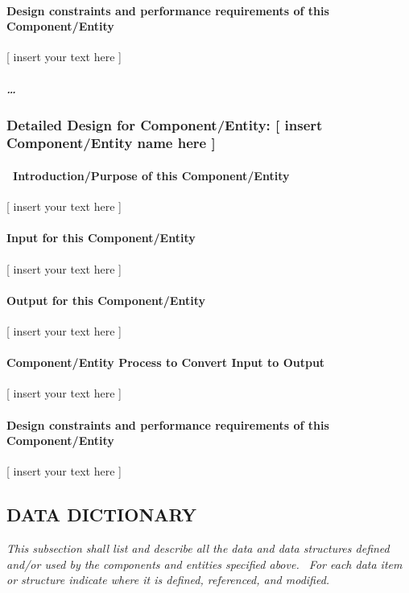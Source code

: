 \documentclass[twoside,letterpaper]{article}
\begin{document}
\paragraph{Design constraints and performance requirements of this
Component/Entity}
{\color{black}
[ insert your text here ]}

\subparagraph[{\dots}]{{\dots}}
\subsubsection{Detailed Design for Component/Entity: [ insert
Component/Entity name here ]}
\paragraph[\ Introduction/Purpose of this
Component/Entity]{\ Introduction/Purpose of this Component/Entity}
{\color{black}
[ insert your text here ]}

\paragraph{Input for this Component/Entity}
{\color{black}
[ insert your text here ]}

\paragraph{Output for this Component/Entity}
{\color{black}
[ insert your text here ]}

\paragraph{Component/Entity Process to Convert Input to Output}
{\color{black}
[ insert your text here ]}

\paragraph{Design constraints and performance requirements of this
Component/Entity}
{\color{black}
[ insert your text here ]}

\subsection{DATA DICTIONARY}
{\itshape\color{black}
This subsection shall list and describe all the data and data structures
defined and/or used by the components and entities specified above.
\ For each data item or structure indicate where it is defined,
referenced, and modified.}
\end{document}
